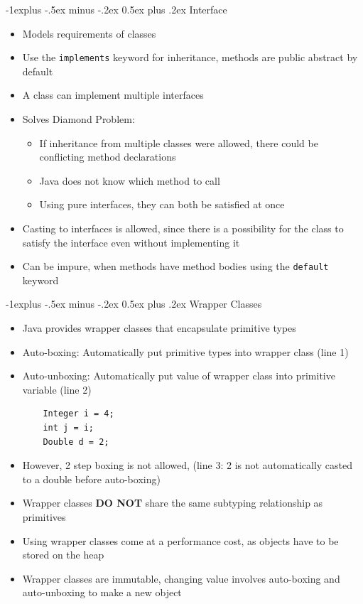 \documentclass[10pt, landscape]{article}
\makeatletter
\renewcommand{\section}{\@startsection{section}{1}{0mm}%
                                {-1ex plus -.5ex minus -.2ex}%
                                {0.5ex plus .2ex}%
                                {\normalfont\large\bfseries}}
\renewcommand{\section}{\@startsection{section}{2}{0mm}%
                                {-1explus -.5ex minus -.2ex}%
                                {0.5ex plus .2ex}%
                                {\normalfont\normalsize\bfseries}}
\makeatother
\begin{document}
\begin{multicols*}{4}
\section{Interface}
\begin{itemize}
    \item Models requirements of classes
    \item Use the \lstinline{implements} keyword for inheritance, methods are public abstract by default
    \item A class can implement multiple interfaces
    \item Solves Diamond Problem:
    \begin{itemize}
        \item If inheritance from multiple classes were allowed, there could be conflicting method declarations
        \item Java does not know which method to call
        \item Using pure interfaces, they can both be satisfied at once
    \end {itemize}
    \item Casting to interfaces is allowed, since there is a possibility for the class to satisfy the interface even without implementing it
    \item Can be impure, when methods have method bodies using the \lstinline{default} keyword
\end{itemize}

\section{Wrapper Classes}
\begin{itemize}
    \item Java provides wrapper classes that encapsulate primitive types
    \item Auto-boxing: Automatically put primitive types into wrapper class (line 1)
    \item Auto-unboxing: Automatically put value of wrapper class into primitive variable (line 2)
    \begin{lstlisting}
    Integer i = 4;
    int j = i;
    Double d = 2;
    \end{lstlisting}
    \item However, 2 step boxing is not allowed, (line 3: 2 is not automatically casted to a double before auto-boxing)
    \item Wrapper classes \textbf{DO NOT} share the same subtyping relationship as primitives
    \item Using wrapper classes come at a performance cost, as objects have to be stored on the heap
    \item Wrapper classes are immutable, changing value involves auto-boxing and auto-unboxing to make a new object
\end{itemize}


\end{multicols*}
\end{document}
